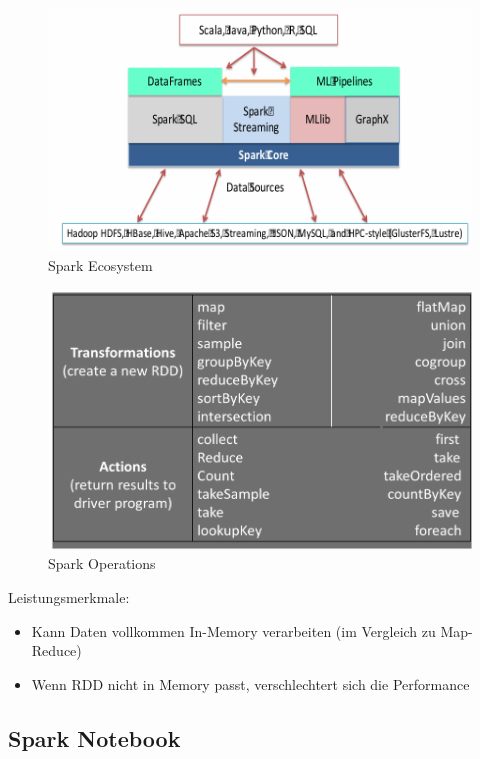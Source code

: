 \documentclass[../Main.tex]{subfiles}
\begin{document}
\begin{figure}[H]
    \centering
    \includegraphics[width=1\linewidth]{Images/spark-ecosystem.png}
    \caption{Spark Ecosystem}
\end{figure}
\begin{figure}[H]
    \centering
    \includegraphics[width=1\linewidth]{Images/spark-operations.png}
    \caption{Spark Operations}
\end{figure}

Leistungsmerkmale:
\begin{itemize}
    \item Kann Daten vollkommen In-Memory verarbeiten (im Vergleich zu Map-Reduce)
    \item Wenn RDD nicht in Memory passt, verschlechtert sich die Performance
\end{itemize}

\subsection{Spark Notebook}
\end{document}
